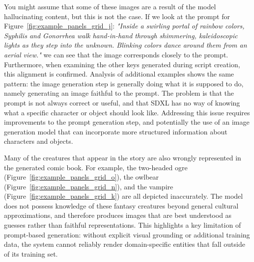 You might assume that some of these images are a result of the model hallucinating content, but this is not the case. If we look at the prompt for Figure~\ref{fig:example_panels_grid_j}: \textit{"Inside a swirling portal of rainbow colors, Syphilis and Gonorrhea walk hand-in-hand through shimmering, kaleidoscopic lights as they step into the unknown. Blinking colors dance around them from an aerial view."} we can see that the image corresponds closely to the prompt. Furthermore, when examining the other keys generated during script creation, this alignment is confirmed. Analysis of additional examples shows the same pattern: the image generation step is generally doing what it is supposed to do, namely generating an image faithful to the prompt. The problem is that the prompt is not always correct or useful, and that SDXL has no way of knowing what a specific character or object should look like. Addressing this issue requires improvements to the prompt generation step, and potentially the use of an image generation model that can incorporate more structured information about characters and objects.

Many of the creatures that appear in the story are also wrongly represented in the generated comic book. For example, the two-headed ogre (Figure~\ref{fig:example_panels_grid_o}), the owlbear (Figure~\ref{fig:example_panels_grid_n}), and the vampire (Figure~\ref{fig:example_panels_grid_k}) are all depicted inaccurately. The model does not possess knowledge of these fantasy creatures beyond general cultural approximations, and therefore produces images that are best understood as guesses rather than faithful representations. This highlights a key limitation of prompt-based generation: without explicit visual grounding or additional training data, the system cannot reliably render domain-specific entities that fall outside of its training set.

